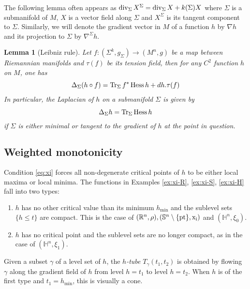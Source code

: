 \documentclass[11pt]{article}
\newtheorem{lemma}[theorem]{Lemma}
\newcommand{\tr}{\mathop{\rm Tr}\nolimits}
\newcommand{\dive}{\mathop{\rm div}\nolimits}
\DeclareMathOperator{\hess}{Hess}
\begin{document}
The following lemma often appears as \(\dive_\Sigma X^\Sigma = \dive_\Sigma X + k(\Sigma)X\) where \(\Sigma\) is a submanifold of \(M\), \(X\) is a vector
field along \(\Sigma\) and \(X^\Sigma\) is its tangent component to \(\Sigma\). Similarly, we will denote the gradient vector in \(M\) of a function \(h\) by \(\nabla
h\) and its projection to \(\Sigma\) by \(\nabla^\Sigma h\).
\begin{lemma}[Leibniz rule]
\label{lem:chain-rule}
Let \(f:(\Sigma^k,g_\Sigma) \longrightarrow (M^n, g)\) be a map between Riemannian manifolds and \(\tau(f)\) be its tension
field, then for any \(C^2\) function \(h\) on \(M\), one has
\begin{equation}
\label{eq:chain-rule}
\Delta_{\Sigma} (h\circ f) = \tr_{\Sigma} f^*\hess h + dh.\tau(f)
\end{equation}
In particular, the Laplacian of \(h\) on a submanifold \(\Sigma\) is given by 
\begin{equation}
\label{eq:hess-lap}
\Delta_\Sigma h = \tr_\Sigma \hess h  
\end{equation} 
if \(\Sigma\) is either minimal or tangent to the gradient of \(h\) at the point in question.
\end{lemma}

\subsection{Weighted monotonicity}
\label{sec:org767fcba}

Condition \eqref{eq:xi} forces all non-degenerate critical points of \(h\) to be either
 local maxima or local minima. The functions in Examples \ref{ex:xi-R},
\ref{ex:xi-S}, \ref{ex:xi-H} fall into two types:
\begin{enumerate}
\item \(h\) has no other critical value than its minimum \(h_{\min}\) and the sublevel sets
\(\{h\leq t\}\) are compact. 
This is the case of \((\mathbb{R}^n,\rho), (\mathbb{S}^n\setminus\{\rm pt\},x_i)\) and \((\mathbb{H}^n,\xi_0)\).
\item \(h\) has no critical point and the sublevel sets are no longer
compact, as in the case of \((\mathbb{H}^n,\xi_1)\).
\end{enumerate}

Given a subset \(\gamma\) of a level set of \(h\), the \emph{\(h\)-tube} \(T_{\gamma}(t_1, t_2)\) is obtained by flowing \(\gamma\) along the
gradient field of \(h\) from level \(h=t_1\) to level \(h=t_2\). When \(h\) is of the first type and \(t_1=h_{\min}\), this is visually a cone.
\end{document}
